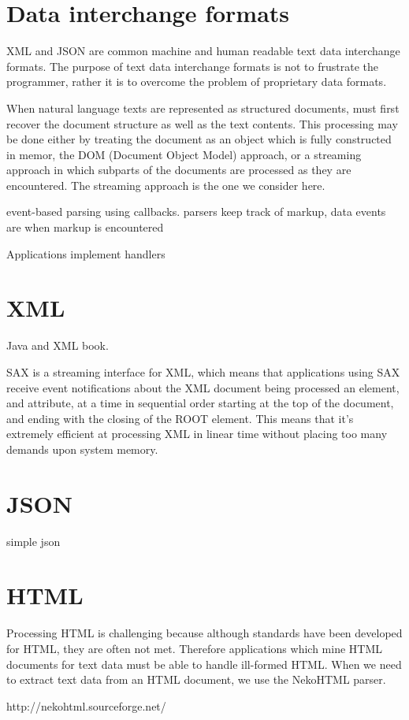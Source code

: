 \section{Data interchange formats}




XML and JSON are common machine and human readable text data interchange formats. 
The purpose of text data interchange formats is not to frustrate the programmer,
rather it is to overcome the problem of proprietary data formats.

When natural language texts are represented as structured documents,
must first recover the document structure as well as the text contents.
This processing may be done either by treating the document as an object
which is fully constructed in memor, the DOM (Document Object Model) approach,
or a streaming approach in which subparts of the documents are processed as
they are encountered.  The streaming approach is the one we consider here.

event-based parsing using callbacks.
parsers keep track of markup, data
events are when markup is encountered

Applications implement handlers 


\section{XML}

Java and XML book.

SAX is a streaming interface for XML, which means that applications using SAX receive event notifications about the XML document being processed an element, and attribute, at a time in sequential order starting at the top of the document, and ending with the closing of the ROOT element. This means that it’s extremely efficient at processing XML in linear time without placing too many demands upon system memory.


\section{JSON}

simple json

\section{HTML}

Processing HTML is challenging because although standards
have been developed for HTML, they are often not met.
Therefore applications which mine HTML documents for text data
must be able to handle ill-formed HTML.
When we need to extract text data from an HTML document,
we use the NekoHTML parser.

http://nekohtml.sourceforge.net/

